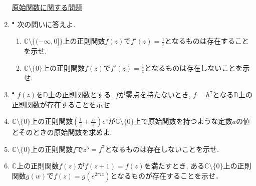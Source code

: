 \documentclass[dvipdfmx,a4paper,11pt]{article}
\newcommand{\C}{\mathbb{C}}
\newcommand{\D}{\mathbb{D}}
\theoremstyle{definition}
\begin{document}
\begin{enumerate}[label=\textbf{問}8.\arabic*]
  
  
  


\hspace{-36pt}\underline{原始関数に関する問題}


\item $^{\bullet}$ 
次の問いに答えよ.
\vspace{-12pt}
   \begin{enumerate}
\setlength{\parskip}{0cm} 
  \setlength{\itemsep}{0cm} 
 \item $\C \setminus \{ ( -\infty, 0]\}$上の正則関数$f(z)$で$f'(z) = \frac{1}{z}$となるものは存在することを示せ.
\item $\C \setminus \{ 0\}$上の正則関数$f(z)$で$f'(z) = \frac{1}{z}$となるものは存在しないことを示せ.
  \end{enumerate}

\item $^{\bullet}$  $f(z)$を$\D$上の正則関数とする. $f$が零点を持たないとき, $f = h^7$となる$\D$上の正則関数が存在することを示せ.



\item  $\C \setminus \{ 0\}$上の正則関数$( \frac{1}{z} + \frac{a}{z^3})e^z$が$\C \setminus \{ 0\}$上で原始関数を持つような定数$a$の値とそのときの原始関数を求めよ. 

\item $\C \setminus \{ 0\}$上の正則関数$f$で$z^5 = f^7$となるものは存在しないことを示せ. 

\item $\C$上の正則関数$f(z)$が$f(z+1)=f(z)$を満たすとき, ある$\C \setminus \{ 0\}$上の正則関数$g(w)$で$f(z) = g(e^{2 \pi i z})$となるものが存在することを示せ． 


\end{enumerate}
\end{document}
